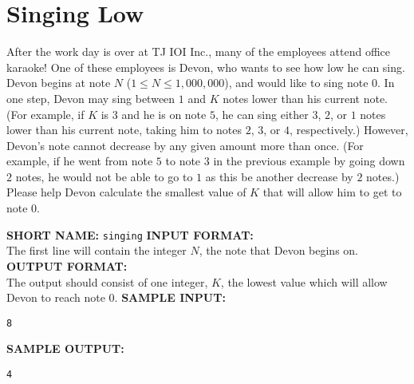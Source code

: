 \section{Singing Low}

After the work day is over at TJ IOI Inc., many of the employees attend office karaoke! One of these employees is Devon, who wants to see how low he can sing. Devon begins at note $N$ ($1 \leq N \leq 1,000,000 $), and would like to sing note $0$. In one step, Devon may sing between $1$ and $K$ notes lower than his current note. (For example, if $K$ is $3$ and he is on note $5$, he can sing either $3$, $2$, or $1$ notes lower than his current note, taking him to notes $2$, $3$, or $4$, respectively.)
\blank
However, Devon's note cannot decrease by any given amount more than once. (For example, if he went from note $5$ to note $3$ in the previous example by going down $2$ notes, he would not be able to go to $1$ as this be another decrease by $2$ notes.) Please help Devon calculate the smallest value of $K$ that will allow him to get to note $0$.

\blank
\textbf{SHORT NAME:} \verb|singing|
\blank
\textbf{INPUT FORMAT:}\\
The first line will contain the integer $ N $, the note that Devon begins on.
\blank
\textbf{OUTPUT FORMAT:}\\
The output should consist of one integer, $ K $, the lowest value which will allow Devon to reach note $ 0 $.
\blank
\textbf{SAMPLE INPUT:}
\begin{verbatim}
8
\end{verbatim}
\textbf{SAMPLE OUTPUT:}
\begin{verbatim}
4
\end{verbatim}
